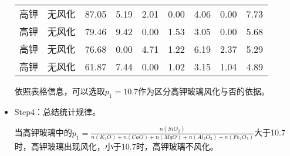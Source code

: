 \documentclass[withoutpreface,bwprint]{cumcmthesis} %
\begin{document}
\begin{itemize}
\begin{table}[!h]
\begin{tabular}{@{}ccccccccc@{}}
			高钾          & 无风化           & 87.05                                                          & 5.19                                                         & 2.01                                                         & 0.00                                                         & 4.06                                                           & 0.00                                                           & 7.73                                                            \\
			高钾          & 无风化           & 79.46                                                          & 9.42                                                         & 0.00                                                         & 1.53                                                         & 3.05                                                           & 0.00                                                           & 5.68                                                            \\
			高钾          & 无风化           & 76.68                                                          & 0.00                                                         & 4.71                                                         & 1.22                                                         & 6.19                                                           & 2.37                                                           & 5.29                                                            \\
			高钾          & 无风化           & 61.87                                                          & 7.44                                                         & 0.00                                                         & 1.02                                                         & 3.15                                                           & 1.04                                                           & 4.89                                                            \\ \bottomrule
		\end{tabular}
	\end{table}
	
	
	依照表格信息，可以选取$p_{1}=10.7$作为区分高钾玻璃风化与否的依据。
	
	\item Step4：总结统计规律。
	
	
	 当高钾玻璃中的$p_{1}=\frac{n(SiO_{2})}{n(K_{2}O)+n(CaO)+n(MgO)+n(Al_{2}O_{3})+n(Fe_{2}O_{3})}$大于10.7时，高钾玻璃出现风化，小于10.7时，高钾玻璃不风化。
	
\end{itemize}
\end{document}
